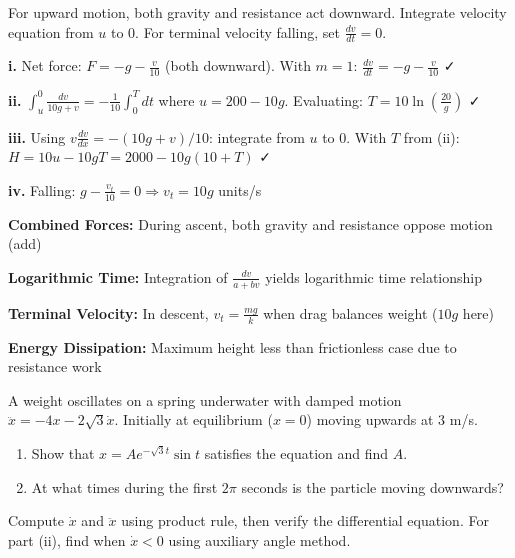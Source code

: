 \begin{hint}
For upward motion, both gravity and resistance act downward. Integrate velocity equation from $u$ to $0$. For terminal velocity falling, set $\frac{dv}{dt} = 0$.
\end{hint}

\begin{solution}
\textbf{i.} Net force: $F = -g - \frac{v}{10}$ (both downward). With $m=1$: $\frac{dv}{dt} = -g - \frac{v}{10}$ ✓

\textbf{ii.} $\int_{u}^{0} \frac{dv}{10g+v} = -\frac{1}{10}\int_0^T dt$ where $u = 200-10g$. Evaluating: $T = 10\ln\left(\frac{20}{g}\right)$ ✓

\textbf{iii.} Using $v\frac{dv}{dx} = -(10g+v)/10$: integrate from $u$ to $0$. With $T$ from (ii): $H = 10u - 10gT = 2000 - 10g(10+T)$ ✓

\textbf{iv.} Falling: $g - \frac{v_t}{10} = 0 \Rightarrow v_t = 10g$ units/s
\end{solution}

\begin{takeaways}
\item \textbf{Combined Forces:} During ascent, both gravity and resistance oppose motion (add)
\item \textbf{Logarithmic Time:} Integration of $\frac{dv}{a+bv}$ yields logarithmic time relationship
\item \textbf{Terminal Velocity:} In descent, $v_t = \frac{mg}{k}$ when drag balances weight ($10g$ here)
\item \textbf{Energy Dissipation:} Maximum height less than frictionless case due to resistance work
\end{takeaways}

\begin{problem}
A weight oscillates on a spring underwater with damped motion $\ddot{x} = -4x - 2\sqrt{3}\dot{x}$. Initially at equilibrium ($x=0$) moving upwards at $3$ m/s.
\begin{enumerate}[label=\textbf{\roman*.}]
    \item Show that $x = Ae^{-\sqrt{3}t} \sin t$ satisfies the equation and find $A$.
    \item At what times during the first $2\pi$ seconds is the particle moving downwards?
\end{enumerate}
\end{problem}

\begin{hint}
Compute $\dot{x}$ and $\ddot{x}$ using product rule, then verify the differential equation. For part (ii), find when $\dot{x} < 0$ using auxiliary angle method.
\end{hint}


